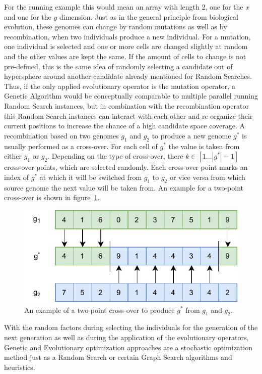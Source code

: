 For the running example this would mean an array with length 2, one for the $x$ and one for the $y$ dimension.\newline
Just as in the general principle from biological evolution, these genomes can change by random mutations as well as by recombination, when two individuals produce a new individual.
For a mutation, one individual is selected and one or more cells are changed slightly at random and the other values are kept the same.
If the amount of cells to change is not pre-defined, this is the same idea of randomly selecting a candidate out of hypersphere around another candidate already mentioned for Random Searches.
Thus, if the only applied evolutionary operator is the mutation operator, a Genetic Algorithm would be conceptually comparable to multiple parallel running Random Search instances, but in combination with the recombination operator this Random Search instances can interact with each other and re-organize their current positions to increase the chance of a high candidate space coverage.\newline
A recombination based on two genomes $g_1$ and $g_2$ to produce a new genome $g^*$ is usually performed as a cross-over.
For each cell of $g^*$ the value is taken from either $g_1$ or $g_2$.
Depending on the type of cross-over, there $k \in [1 ... |g^*| - 1]$ cross-over points, which are selected randomly.
Each cross-over point marks an index of $g^*$ at which it will be switched from $g_1$ to $g_2$ or vice versa from which source genome the next value will be taken from.
An example for a two-point cross-over is shown in figure~\ref{fig:theory:crossover}.
\begin{figure}[ht!]
    \centering
    \includegraphics[width=\textwidth]{gfx/Figures/Theory/Crossover.pdf}
    \caption{An example of a two-point cross-over to produce $g^*$ from $g_1$ and $g_2$.}
    \label{fig:theory:crossover}
\end{figure}
With the random factors during selecting the individuals for the generation of the next generation as well as during the application of the evolutionary operators, Genetic and Evolutionary optimization approaches are a stochastic optimization method just as a Random Search or certain Graph Search algorithms and heuristics.
